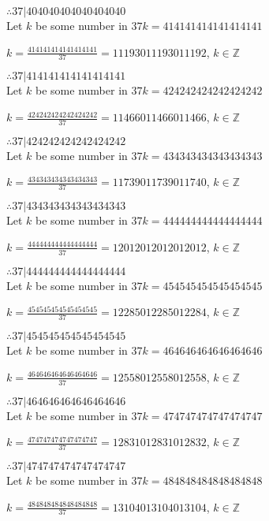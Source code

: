 \documentclass{article}
\begin{document}
$ \therefore  37|404040404040404040 $ \\

Let $k$ be some number in $37k = 414141414141414141$

$k = \frac{414141414141414141}{37} = 11193011193011192$, $k \in \mathbb{Z}$

$ \therefore  37|414141414141414141 $ \\

Let $k$ be some number in $37k = 424242424242424242$

$k = \frac{424242424242424242}{37} = 11466011466011466$, $k \in \mathbb{Z}$

$ \therefore  37|424242424242424242 $ \\

Let $k$ be some number in $37k = 434343434343434343$

$k = \frac{434343434343434343}{37} = 11739011739011740$, $k \in \mathbb{Z}$

$ \therefore  37|434343434343434343 $ \\

Let $k$ be some number in $37k = 444444444444444444$

$k = \frac{444444444444444444}{37} = 12012012012012012$, $k \in \mathbb{Z}$

$ \therefore  37|444444444444444444 $ \\

Let $k$ be some number in $37k = 454545454545454545$

$k = \frac{454545454545454545}{37} = 12285012285012284$, $k \in \mathbb{Z}$

$ \therefore  37|454545454545454545 $ \\

Let $k$ be some number in $37k = 464646464646464646$

$k = \frac{464646464646464646}{37} = 12558012558012558$, $k \in \mathbb{Z}$

$ \therefore  37|464646464646464646 $ \\

Let $k$ be some number in $37k = 474747474747474747$

$k = \frac{474747474747474747}{37} = 12831012831012832$, $k \in \mathbb{Z}$

$ \therefore  37|474747474747474747 $ \\

Let $k$ be some number in $37k = 484848484848484848$

$k = \frac{484848484848484848}{37} = 13104013104013104$, $k \in \mathbb{Z}$
\end{document}
